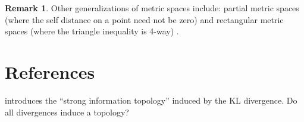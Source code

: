 \documentclass{article}
\theoremstyle{definition}
\newtheorem{remark}{Remark}
\newcommand{\+}{\oplus}
\begin{document}
\begin{remark}
    Other generalizations of metric spaces include:
    partial metric spaces (where the self distance on a point need not be zero)
    and rectangular metric spaces (where the triangle inequality is 4-way) \citep{shukla2014partial}.
\end{remark}


\section{References}

\citet{harremoes2007information} introduces the ``strong information topology'' induced by the KL divergence.
Do all divergences induce a topology?


\clearpage


\end{document}
